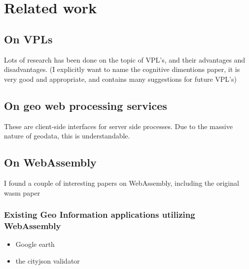 \newpage
\section{Related work}

\subsection{On VPLs}
Lots of research has been done on the topic of VPL's, and their advantages and disadvantages. 
(I explicitly want to name the cognitive dimentions paper, it is very good and appropriate, and contains many suggestions for future VPL's)


\subsection{On geo web processing services}
These are client-side interfaces for server side processes. 
Due to the massive nature of geodata, this is understandable.


\subsection{On WebAssembly}
I found a couple of interesting papers on WebAssembly, including the original wasm paper



\subsubsection*{Existing Geo Information applications utilizing WebAssembly}

\begin{itemize}
  \item Google earth
  \item the cityjson validator
\end{itemize}